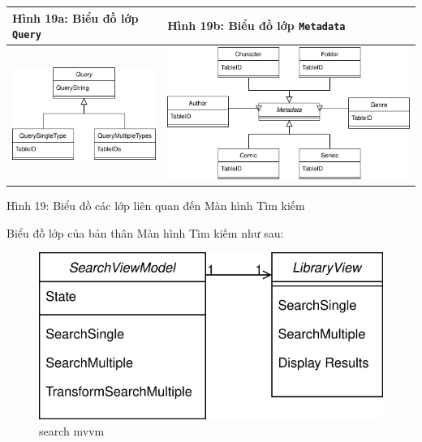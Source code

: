 \documentclass[
]{article}
\begin{document}
\begin{longtable}[]{@{}ll@{}}
\toprule
Hình 19a: Biểu đồ lớp \texttt{Query} & Hình 19b: Biểu đồ lớp
\texttt{Metadata} \\
\midrule
\endhead
\includegraphics{../images/query_class.svg} &
\includegraphics{../images/metadata_class.svg} \\
\bottomrule
\end{longtable}

Hình 19: Biểu đồ các lớp liên quan đến Màn hình Tìm kiếm

Biểu đồ lớp của bản thân Màn hình Tìm kiếm như sau:

\begin{figure}
\centering
\includegraphics{../images/search_mvvm_class.svg}
\caption{search mvvm}
\end{figure}
\end{document}
